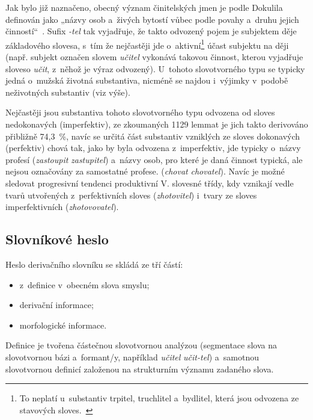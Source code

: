 Jak bylo již naznačeno, obecný význam činitelských jmen je podle
Dokulila definován jako „názvy osob a~živých bytostí vůbec podle povahy
a~druhu jejich činností``~\parencite[17]{dokulil67}. Sufix \emph{-tel}
tak vyjadřuje, že takto odvozený pojem je subjektem děje základového
slovesa, s~tím že nejčastěji jde
o~aktivní\footnote{To neplatí u~substantiv trpitel, truchlitel a~bydlitel, která jsou odvozena ze stavových sloves.~\parencite[17]{dokulil67}}
účast subjektu na ději (např. subjekt označen slovem \emph{učitel}
vykonává takovou činnost, kterou vyjadřuje sloveso \emph{učit}, z~něhož
je výraz odvozený). U~tohoto slovotvorného typu se typicky jedná
o~mužská životná substantiva, nicméně se najdou i~výjimky v~podobě
neživotných substantiv (viz výše).~\parencite{simandl2016}

Nejčastěji jsou substantiva tohoto slovotvorného typu odvozena od sloves
nedokonavých (imperfektiv), ze zkoumaných 1129 lemmat je jich takto
derivováno přibližně 74,3~\%, navíc se určitá část substantiv vzniklých
ze sloves dokonavých (perfektiv) chová tak, jako by byla odvozena
z~imperfektiv, jde typicky o~názvy profesí (\emph{zastoupit}
\rightarrow \emph{zastupitel}) a~názvy osob, pro které je daná
činnost typická, ale nejsou označovány za samostatné profese.
(\emph{chovat} \rightarrow \emph{chovatel}). Navíc je možné
sledovat progresivní tendenci produktivní V. slovesné třídy, kdy
vznikají vedle tvarů utvořených z~perfektivních sloves
(\emph{zhotovitel}) i~tvary ze sloves imperfektivních
(\emph{zhotovovatel}).~\parencite{adri}

\hypertarget{slovnuxedkovuxe9-heslo}{%
\subsection{Slovníkové heslo}\label{slovnuxedkovuxe9-heslo}}

Heslo derivačního slovníku se skládá ze tří částí:

\begin{itemize}
\tightlist
\item
  z~definice v~obecném slova smyslu;
\item
  derivační informace;
\item
  morfologické informace.
\end{itemize}

Definice je tvořena částečnou slovotvornou analýzou (segmentace slova na
slovotvornou bázi a~formant/y, například \emph{učitel} \rightarrow
\emph{učit-tel}) a~samotnou slovotvornou definicí založenou na
strukturním významu zadaného slova.

